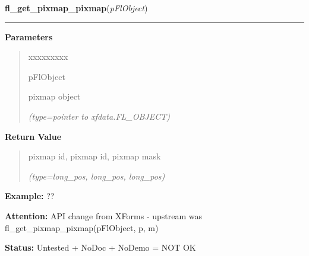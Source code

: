 \hspace{.8\funcindent}\begin{boxedminipage}{\funcwidth}

    \raggedright \textbf{fl\_get\_pixmap\_pixmap}(\textit{pFlObject})

    \vspace{-1.5ex}

    \rule{\textwidth}{0.5\fboxrule}
\setlength{\parskip}{2ex}
\setlength{\parskip}{1ex}
      \textbf{Parameters}
      \vspace{-1ex}

      \begin{quote}
        \begin{Ventry}{xxxxxxxxx}

          \item[pFlObject]

          pixmap object

            {\it (type=pointer to xfdata.FL\_OBJECT)}

        \end{Ventry}

      \end{quote}

      \textbf{Return Value}
    \vspace{-1ex}

      \begin{quote}
      pixmap id, pixmap id, pixmap mask

      {\it (type=long\_pos, long\_pos, long\_pos)}

      \end{quote}

\textbf{Example:} ??



\textbf{Attention:} API change from XForms - upstream was fl\_get\_pixmap\_pixmap(pFlObject, p,
m)



\textbf{Status:} Untested + NoDoc + NoDemo = NOT OK



    \end{boxedminipage}

    \label{xformslib:flbitmap:fl_get_pixmap_pixmap}

    \vspace{0.5ex}

